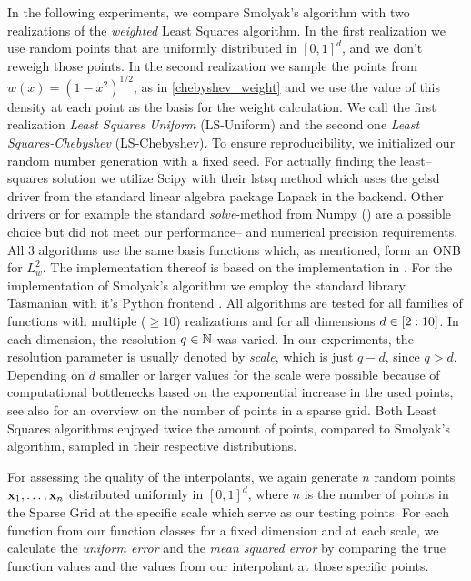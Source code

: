\documentclass[12pt, oneside]{amsart}
\theoremstyle{definition}
\theoremstyle{remark}
\numberwithin{equation}{section}
\begin{document}
In the following experiments, we compare Smolyak's algorithm with two 
realizations of the \emph{weighted} Least Squares algorithm. In the first 
realization we use random points that are uniformly distributed in $[0,1]^d$, 
and we don't reweigh those points. In the second realization we sample the 
points from $w(x) = (1-x^2)^{1/2}$, as in \ref{chebyshev_weight} and we use the 
value of 
this density at each point as the basis for the weight calculation.
We call the first realization \emph{Least Squares Uniform} (LS-Uniform) and the 
second one \emph{Least Squares-Chebyshev} (LS-Chebyshev). 
To ensure reproducibility, we initialized our random number generation with a 
fixed seed.
For actually finding the least--squares solution we utilize Scipy 
\cite{Virtanen_Scipy} with their \textrm{lstsq} method which uses the 
\textrm{gelsd} driver from the standard linear algebra package Lapack 
\cite{lapack99} in the backend.
Other drivers or for example the standard \emph{solve}-method from Numpy 
(\cite{HarrisNumpy_2020}) are a possible choice but did not meet our 
performance-- and numerical precision requirements.
All 3 algorithms use the same basis functions  
which, as mentioned, form an ONB for \(L^2_w\). The implementation thereof is 
based on the implementation in \cite{JuddSmolyak_2014}. For the implementation 
of Smolyak's algorithm we employ the standard library Tasmanian with it's 
Python frontend 
\cite{stoyanov2015tasmanian,stoyanov2016dynamically,stoyanov2018adaptive,morrow2019method,doecode_6305}.
All algorithms are tested for all families of functions with multiple (\(\geq 
10\)) realizations and for all dimensions $d\in \indexset[2]{10}$. In 
each dimension, the resolution $q\in\N$ was varied. In our experiments, the 
resolution parameter is usually denoted by \emph{scale}, which is just $q-d$, 
since $q>d$. Depending on $d$ smaller or larger values for the scale were 
possible because of computational bottlenecks based on the exponential increase 
in the used points, see also \cite{BurkardtCounting_2014} for an overview on 
the number of points in a sparse grid. Both Least Squares algorithms enjoyed 
twice the amount of points, compared to Smolyak's algorithm, sampled in their 
respective distributions.

For assessing the quality of the interpolants, we again generate $n$ random 
points $\bfx_1, \ldots, \bfx_n$ distributed uniformly in $[0,1]^d$, where $n$ 
is the number of points in the Sparse Grid at the specific scale which serve as 
our testing points. For each function from our function classes for a fixed 
dimension and at each scale, we calculate 
the \emph{uniform error} and the \emph{mean squared error} by comparing the 
true function values and the values from our interpolant at those specific 
points.
\end{document}
